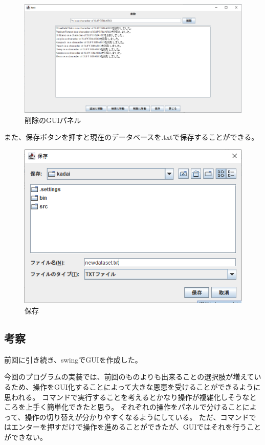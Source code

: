 \documentclass{jarticle}
\begin{document}
\begin{figure}[!hbt]
  \centering
  \includegraphics[bb=0 0 986 493,width=1.2\linewidth]{pic5.png}
  \caption{削除のGUIパネル}
  \label{fig:pic5}
\end{figure}

また、保存ボタンを押すと現在のデータベースを.txtで保存することができる。
\begin{figure}[!hbt]
  \centering
  \includegraphics[bb=0 0 505 358,width=1\linewidth]{pic7.png}
  \caption{保存}
  \label{fig:pic7}
\end{figure}

\subsection{考察}
前回に引き続き、swingでGUIを作成した。

今回のプログラムの実装では、前回のものよりも出来ることの選択肢が増えているため、操作をGUI化することによって大きな恩恵を受けることができるように思われる。
コマンドで実行することを考えるとかなり操作が複雑化しそうなところを上手く簡単化できたと思う。
それぞれの操作をパネルで分けることによって、操作の切り替えが分かりやすくなるようにしている。
ただ、コマンドではエンターを押すだけで操作を進めることができたが、GUIではそれを行うことができない。
\end{document}

